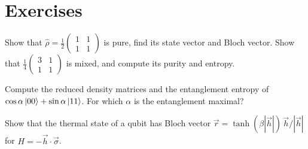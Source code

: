 \section{Exercises}
\begin{exercise}
Show that $\hat\rho=\frac12\begin{pmatrix}1&1\\1&1\end{pmatrix}$ is pure, find its state vector and Bloch vector. Show that $\frac14\begin{pmatrix}3&1\\1&1\end{pmatrix}$ is
mixed, and compute its purity and entropy.
\end{exercise}
\begin{exercise}
Compute the reduced density matrices and the entanglement entropy of $\cos\alpha\left|00\right\rangle+\sin\alpha\left|11\right\rangle$. For which $\alpha$ is the entanglement maximal?
\end{exercise}
\begin{exercise}
Show that the thermal state of a qubit has Bloch vector $\vec r=\tanh(\beta|\vec h|)\,\vec h/|\vec h|$ for $H=-\vec h\cdot\vec\sigma$.
\end{exercise}
